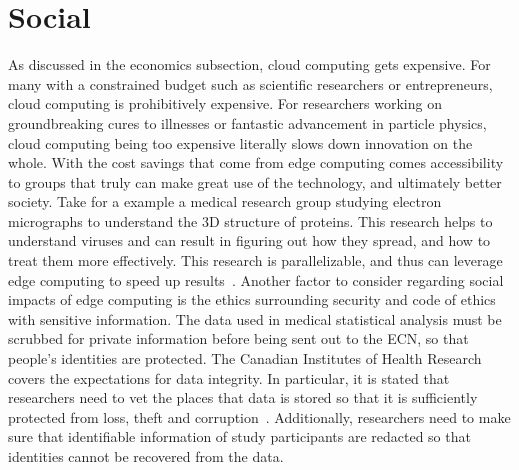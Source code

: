 \documentclass[../mthe-493-final-project.tex]{subfiles}
\begin{document}
    \section{Social}
    \label{sec:social}
    As discussed in the economics subsection, cloud computing gets expensive. For many with a constrained budget such as scientific researchers or entrepreneurs, cloud computing is prohibitively expensive. For researchers working on groundbreaking cures to illnesses or fantastic advancement in particle physics, cloud computing being too expensive literally slows down innovation on the whole. With the cost savings that come from edge computing comes accessibility to groups that truly can make great use of the technology, and ultimately better society. Take for a example a medical research group studying electron micrographs to understand the 3D structure of proteins. This research helps to understand viruses and can result in figuring out how they spread, and how to treat them more effectively. This research is parallelizable, and thus can leverage edge computing to speed up results~\cite{parallel-computing-biomedical-research}. Another factor to consider regarding social impacts of edge computing is the ethics surrounding security and code of ethics with sensitive information. The data used in medical statistical analysis must be scrubbed for private information before being sent out to the ECN, so that people's identities are protected. The Canadian Institutes of Health Research covers the expectations for data integrity. In particular, it is stated that researchers need to vet the places that data is stored so that it is sufficiently protected from loss, theft and corruption~\cite{privacy-health-research-best-practices}. Additionally, researchers need to make sure that identifiable information of study participants are redacted so that identities cannot be recovered from the data.
\end{document}
